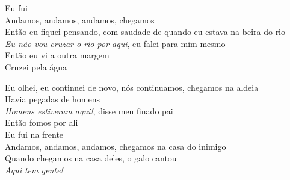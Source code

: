 \bigskip

\begin{linenumbers}
 
\noindent   Eu fui\\
  Andamos, andamos, andamos, chegamos\\
  Então eu fiquei pensando, com saudade de quando eu estava na beira do rio\\
  \textit{Eu não vou cruzar o rio por aqui}, eu falei para mim mesmo\\
  Então eu vi a outra margem\\
  Cruzei pela água
 
\end{linenumbers}

\bigskip

\begin{linenumbers}
 
\noindent   Eu olhei, eu continuei de novo, nós continuamos, chegamos na aldeia\\
  Havia pegadas de homens\\
  \textit{Homens estiveram aqui!}, disse meu finado pai\\
  Então fomos por ali\\
  Eu fui na frente\\
  Andamos, andamos, andamos, chegamos na casa do inimigo\\
  Quando chegamos na casa deles, o galo cantou\\
  \textit{Aqui tem gente!}
 
\end{linenumbers}

